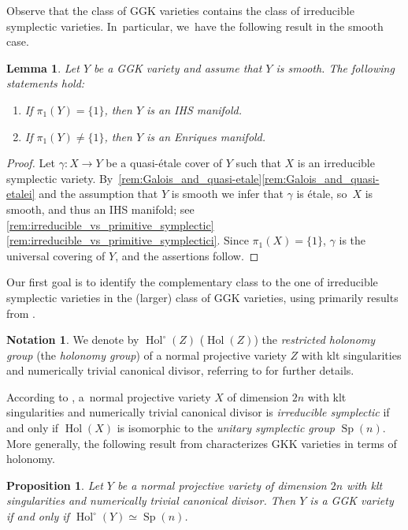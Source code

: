 \documentclass[JEP,XML,SOM,Unicode,published]{cedram}
\theoremstyle{plain}
\newtheorem{prop}[thm]{Proposition}
\newtheorem{lem}[thm]{Lemma}
\theoremstyle{definition}
\newtheorem*{notation}{Notation}
\DeclareMathOperator{\Hol}{Hol}
\DeclareMathOperator{\Sp}{Sp}
\begin{document}
Observe that the class of GGK varieties contains the class of irreducible symplectic varieties. In~particular, we~have the following result in the smooth case.

\begin{lem}
\label{lem:smooth_GGK}
Let $Y$ be a GGK variety and assume that $Y$ is smooth. The following statements hold:
\begin{enumerate}
\item
If $\pi_1(Y) = \{ 1 \}$, then $Y$ is an IHS manifold.

\item
If $\pi_1(Y) \neq \{ 1 \}$, then $Y$ is an Enriques manifold.
\end{enumerate}
\end{lem}

\begin{proof}
Let $\gamma \colon X\to Y$ be a quasi-étale cover of $Y$ such that $X$ is an irreducible symplectic variety. By~\autoref{rem:Galois_and_quasi-etale}\eqref{rem:Galois_and_quasi-etalei} and the assumption that $Y$ is smooth we infer that $\gamma$ is étale, so~$X$ is smooth, and thus an IHS manifold; see \autoref{rem:irreducible_vs_primitive_symplectic}\eqref{rem:irreducible_vs_primitive_symplectici}. Since $\pi_1(X) = \{ 1 \}$, $\gamma$ is the universal covering of $Y$, and the assertions follow.
\end{proof}

Our first goal is to identify the complementary class to the one of irreducible symplectic varieties in the (larger) class of GGK varieties, using primarily results from \cite{GKP16a,GKP16b,GGK19}.

\begin{notation}
We denote by $\Hol^\circ (Z)$ (\resp $\Hol(Z)$) the \emph{restricted holonomy group} (\resp the \emph{holonomy group}) of a normal projective variety $Z$ with klt singularities and numerically trivial canonical divisor, referring to \cite{GGK19} for further details.
\end{notation}

According to \cite[Prop.\,F]{GGK19}, a~normal projective variety $X$ of dimension $2n$ with klt singularities and numerically trivial canonical divisor is \emph{irreducible symplectic} if and only if $\Hol(X)$ is isomorphic to the \emph{unitary symplectic group} $\Sp(n)$. More generally, the following result from \cite{GGK19} characterizes GKK varieties in terms of holonomy.

\begin{prop}
\label{prop:characterization_GGK_holonomy}
Let $Y$ be a normal projective variety of dimension $2n$ with klt singularities and numerically trivial canonical divisor. Then $Y$ is a GGK variety if and only if $\Hol^\circ(Y) \simeq \Sp(n)$.
\end{prop}
\end{document}
